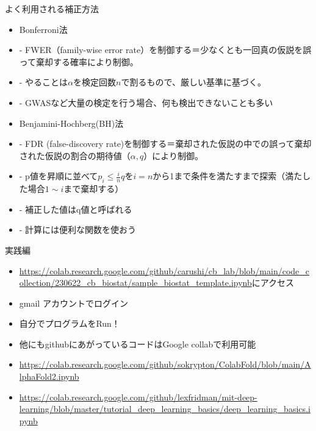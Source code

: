 \documentclass[cjk, aspectratio=169]{beamer}
\begin{document}
    \begin{frame}{よく利用される補正方法}
    \begin{itemize}
        \item Bonferroni法
        \item - FWER（family-wise error rate）を制御する＝少なくとも一回真の仮説を誤って棄却する確率により制御。
        \item - やることは$\alpha$を検定回数$n$で割るもので、厳しい基準に基づく。
        \item - GWASなど大量の検定を行う場合、何も検出できないことも多い
        \item Benjamini-Hochberg(BH)法
        \item - FDR (false-discovery rate)を制御する＝棄却された仮説の中での誤って棄却された仮説の割合の期待値（$\alpha,q$）により制御。
        \item - p値を昇順に並べて$p_i \le \frac{i}{n}q$を$i=n$から1まで条件を満たすまで探索（満たした場合$1 \sim i$まで棄却する）
        \item - 補正した値はq値と呼ばれる
        \item - 計算には便利な関数を使おう
    \end{itemize}
    \end{frame}

\begin{frame}{実践編}
\begin{itemize}
\item \url{https://colab.research.google.com/github/carushi/cb_lab/blob/main/code_collection/230622_cb_biostat/sample_biostat_template.ipynb}にアクセス
\item gmail アカウントでログイン
\item 自分でプログラムをRun！
\item 他にもgithubにあがっているコードはGoogle collabで利用可能
\item \url{https://colab.research.google.com/github/sokrypton/ColabFold/blob/main/AlphaFold2.ipynb}
\item \url{https://colab.research.google.com/github/lexfridman/mit-deep-learning/blob/master/tutorial_deep_learning_basics/deep_learning_basics.ipynb}
\end{itemize}
\end{frame}
\end{document}
